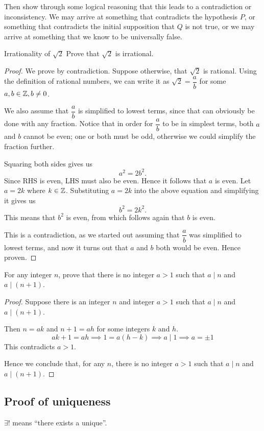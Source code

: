 Then show through some logical reasoning that this leads to a contradiction or inconsistency. We may arrive at something that contradicts the hypothesis $P$, or something that contradicts the initial supposition that $Q$ is not true, or we may arrive at something that we know to be universally false.

\begin{exercise}{Irrationality of $\sqrt{2}$}{}
Prove that $\sqrt{2}$ is irrational.
\end{exercise}
\begin{proof}
We prove by contradiction. Suppose otherwise, that $\sqrt{2}$ is rational. Using the definition of rational numbers, we can write it as $\sqrt{2} = \dfrac{a}{b}$ for some $a,b\in\mathbb Z,b\neq 0$. 

We also assume that $\dfrac{a}{b}$ is simplified to lowest terms, since that can obviously be done with any fraction. Notice that in order for $\dfrac{a}{b}$ to be in simplest terms, both $a$ and $b$ cannot be even; one or both must be odd, otherwise we could simplify the fraction further.

Squaring both sides gives us
\[ a^2 = 2b^2. \]
Since RHS is even, LHS must also be even. Hence it follows that $a$ is even. Let $a=2k$ where $k\in\mathbb Z$. Substituting $a = 2k$ into the above equation and simplifying it gives us
\[ b^2=2k^2. \]
This means that $b^2$ is even, from which follows again that $b$ is even. 

This is a contradiction, as we started out assuming that $\dfrac{a}{b}$ was simplified to lowest terms, and now it turns out that $a$ and $b$ both would be even. Hence proven.
\end{proof}

\begin{exercise}{}{}
For any integer $n$, prove that there is no integer $a>1$ such that $a\mid n$ and $a\mid (n+1)$.
\end{exercise}
\begin{proof}
Suppose there is an integer $n$ and integer $a>1$ such that $a\mid n$ and $a\mid (n+1)$.

Then $n=ak$ and $n+1=ah$ for some integers $k$ and $h$.
\[ ak+1=ah \implies 1=a(h-k) \implies a\mid 1 \implies a=\pm1 \]
This contradicts $a>1$.

Hence we conclude that, for any $n$, there is no integer $a>1$ such that $a\mid n$ and $a\mid (n+1)$.
\end{proof}

\subsection{Proof of uniqueness}
$\exists!$ means ``there exists a unique''.

